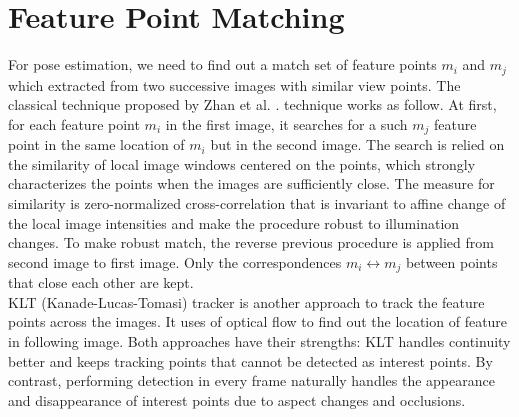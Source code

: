 \section {Feature Point Matching}
For pose estimation, we need to find out a match set of feature points ${m_i}$ and ${m_j}$ which extracted from two successive images with similar view points. The classical technique proposed by Zhan et al. \cite{zhang1995robust}. technique works as follow. At first, for each feature point ${m_i}$ in the first image, it searches for a such ${m_j}$ feature point in the same location of ${m_i}$ but in the second image. The search is relied on the similarity of local image windows centered on the points, which strongly characterizes the points when the images are sufficiently close. The measure for similarity is zero-normalized cross-correlation that is invariant to affine change of the local image intensities and make the procedure robust to illumination changes. To make robust match, the reverse previous procedure is applied from second image to first image. Only the correspondences ${m_i} \longleftrightarrow {m_j}$ between points that close each other are kept.\\
KLT (Kanade-Lucas-Tomasi) tracker \cite{tomasi1991detection} \cite{shi1994good} is another approach to track the feature points across the images. It uses of optical flow to find out the location of feature in following image. Both approaches have their strengths: KLT handles continuity better and keeps tracking points that cannot be detected as interest points. By contrast, performing detection in every frame naturally handles the appearance and disappearance of interest points due to aspect changes and occlusions.

